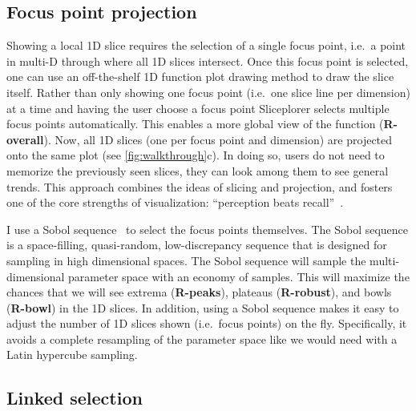 \subsection{Focus point projection}

Showing a local 1D slice requires the selection of a single focus point, i.e.\
a point in multi-D through where all 1D slices intersect. Once this focus
point is selected, one can use an off-the-shelf 1D function plot drawing
method to draw the slice itself.
Rather than only
showing one focus point (i.e.\ one slice line per dimension) at a time and
having the user choose a focus point Sliceplorer selects multiple focus points
automatically. This enables a more global view of the function
(\textbf{R-overall}). Now, all 1D slices (one per focus point and dimension)
are projected onto the same plot (see \autoref{fig:walkthrough}c).  In doing
so, users do not need to memorize the previously seen slices, they can look
among them to see general trends. This approach combines the ideas of slicing
and projection, and fosters one of the core strengths of visualization:
``perception beats recall''~\cite{Munzner:2014}. 

I use a Sobol sequence~\cite{Sobol:1967} to select the focus points
themselves.  The Sobol sequence is a space-filling, quasi-random,
low-discrepancy sequence that is designed for sampling in high dimensional
spaces.  The Sobol sequence will sample the multi-dimensional
parameter space with an economy of samples. This will maximize the chances that
we will see extrema (\textbf{R-peaks}), plateaus (\textbf{R-robust}), and bowls
(\textbf{R-bowl}) in the 1D slices.  In addition, using a Sobol sequence makes
it easy to adjust the number of 1D slices shown (i.e.\ focus points) on the
fly.  Specifically, it avoids a complete resampling of the parameter space like
we would need with a Latin hypercube sampling. 



\subsection{Linked selection}

